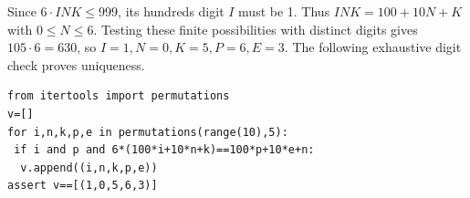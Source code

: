 Since $6\cdot INK\le999$, its hundreds digit $I$ must be 1. Thus $INK=100+10N+K$ with $0\le N\le6$. Testing these finite possibilities with distinct digits gives $\boxed{105\cdot6=630}$, so $I=1,N=0,K=5,P=6,E=3$. The following exhaustive digit check proves uniqueness.
\begin{verbatim}
from itertools import permutations
v=[]
for i,n,k,p,e in permutations(range(10),5):
 if i and p and 6*(100*i+10*n+k)==100*p+10*e+n:
  v.append((i,n,k,p,e))
assert v==[(1,0,5,6,3)]
\end{verbatim}
